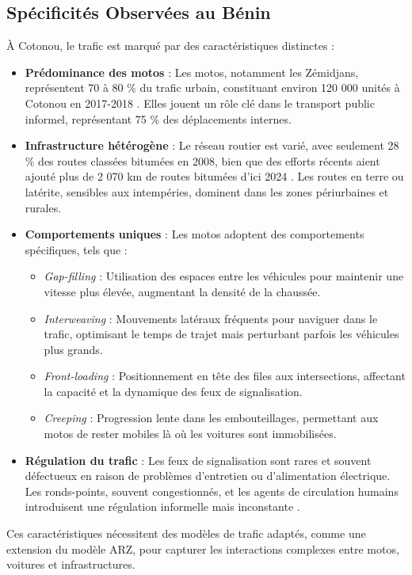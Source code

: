 \subsection{Spécificités Observées au Bénin}
À Cotonou, le trafic est marqué par des caractéristiques distinctes :
\begin{itemize}
    \item \textbf{Prédominance des motos} : Les motos, notamment les Zémidjans, représentent 70 à 80 \% du trafic urbain, constituant environ 120 000 unités à Cotonou en 2017-2018 \cite{gomina2013urban}. Elles jouent un rôle clé dans le transport public informel, représentant 75 \% des déplacements internes.
    \item \textbf{Infrastructure hétérogène} : Le réseau routier est varié, avec seulement 28 \% des routes classées bitumées en 2008, bien que des efforts récents aient ajouté plus de 2 070 km de routes bitumées d'ici 2024 \cite{gomina2013urban}. Les routes en terre ou latérite, sensibles aux intempéries, dominent dans les zones périurbaines et rurales.
    \item \textbf{Comportements uniques} : Les motos adoptent des comportements spécifiques, tels que :
          \begin{itemize}
              \item \textit{Gap-filling} : Utilisation des espaces entre les véhicules pour maintenir une vitesse plus élevée, augmentant la densité de la chaussée.
              \item \textit{Interweaving} : Mouvements latéraux fréquents pour naviguer dans le trafic, optimisant le temps de trajet mais perturbant parfois les véhicules plus grands.
              \item \textit{Front-loading} : Positionnement en tête des files aux intersections, affectant la capacité et la dynamique des feux de signalisation.
              \item \textit{Creeping} : Progression lente dans les embouteillages, permettant aux motos de rester mobiles là où les voitures sont immobilisées.
          \end{itemize}
    \item \textbf{Régulation du trafic} : Les feux de signalisation sont rares et souvent défectueux en raison de problèmes d'entretien ou d'alimentation électrique. Les ronds-points, souvent congestionnés, et les agents de circulation humains introduisent une régulation informelle mais inconstante \cite{gomina2013urban}.
\end{itemize}
Ces caractéristiques nécessitent des modèles de trafic adaptés, comme une extension du modèle ARZ, pour capturer les interactions complexes entre motos, voitures et infrastructures.

